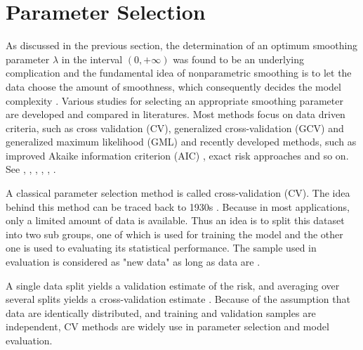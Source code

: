 \section{Parameter Selection}

As discussed in the previous section, the determination of an optimum smoothing parameter $\lambda$ in the interval $(0,+\infty)$ was found to be an underlying complication and the fundamental idea of nonparametric smoothing is to let the data choose the amount of smoothness, which consequently decides the model complexity \cite{gu1998model}. Various studies for selecting an appropriate smoothing parameter are developed and compared in literatures. Most methods focus on data driven criteria, such as cross validation (CV), generalized cross-validation (GCV) \cite{craven1978smoothing} and generalized maximum likelihood (GML) \cite{wahba1985comparison} and recently developed methods, such as improved Akaike information criterion (AIC) \cite{hurvich1998smoothing}, exact risk approaches \cite{wand1997exact} and so on. See \eg \cite{craven1978smoothing}, \cite{hardle1988far}, \cite{hardle1990applied}, \cite{wahba1990spline},  \cite{green1993nonparametric}, \cite{cantoni2001resistant} \cite{aydin2013smoothing}.  


A classical parameter selection method is called cross-validation (CV). The idea behind this method can be traced back to 1930s \cite{larson1931shrinkage}. Because in most applications, only a limited amount of data is available. Thus an idea is to split this dataset into two sub groups, one of which is used for training the model and the other one is used to evaluating its statistical performance. The sample used in evaluation is considered as "new data" as long as data are \iid. 

A single data split yields a validation estimate of the risk, and averaging over several splits yields a cross-validation estimate \cite{arlot2010survey}. Because of the assumption that data are identically distributed, and training and validation samples are independent, CV methods are widely use in parameter selection and model evaluation. 


